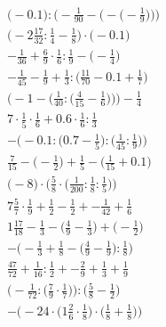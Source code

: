 \documentclass[8pt]{article}
\begin{document}
\begin{align}
\bigg(-0.1\bigg) : \bigg(-\frac{1}{90} - \Big(-\big(-\frac{1}{9}\big)\Big)\bigg) \\
\big(-2\frac{17}{32} : \frac{1}{4} - \frac{1}{8}\big) \cdot \big(-0.1\big) \\
-\frac{1}{36} + \frac{6}{9} \cdot \frac{1}{6} : \frac{1}{9} - \big(-\frac{1}{4}\big) \\
-\frac{1}{45} - \frac{1}{9} + \frac{1}{3} : \big(\frac{11}{70} - 0.1 + \frac{1}{7}\big) \\
\bigg(-1 - \Big(\frac{1}{40} : \big(\frac{4}{15} - \frac{1}{6}\big)\Big)\bigg) - \frac{1}{4} \\
7 \cdot \frac{1}{5} \cdot \frac{1}{6} + 0.6 \cdot \frac{1}{6} : \frac{1}{3} \\
-\Big(-0.1 : \big(0.7 - \frac{1}{5}\big) : \big(\frac{1}{45} : \frac{1}{9}\big)\Big) \\
\frac{7}{15} - \big(-\frac{1}{2}\big) + \frac{1}{5} - \big(\frac{1}{15} + 0.1\big) \\
\Big(-8\Big) \cdot \Big(\frac{5}{8} \cdot \big(\frac{1}{200} : \frac{1}{8} : \frac{1}{5}\big)\Big) \\
7\frac{5}{7} \cdot \frac{1}{9} + \frac{1}{2} - \frac{1}{2} + -\frac{1}{42} + \frac{1}{6} \\
1\frac{17}{18} - \frac{1}{3} - \big(\frac{4}{9} - \frac{1}{3}\big) + \big(-\frac{1}{2}\big) \\
-\Big(-\frac{1}{3} + \frac{1}{8} - \big(\frac{4}{9} - \frac{1}{9}\big) : \frac{1}{8}\Big) \\
\frac{47}{72} + \frac{1}{16} : \frac{1}{2} + -\frac{2}{9} + \frac{1}{3} + \frac{1}{9} \\
\Big(-\frac{1}{72} : \big(\frac{7}{9} \cdot \frac{1}{7}\big)\Big) : \Big(\frac{5}{8} - \frac{1}{2}\Big) \\
-\Big(-24 \cdot \big(1\frac{2}{6} \cdot \frac{1}{8}\big) \cdot \big(\frac{1}{8} + \frac{1}{8}\big)\Big)
\end{align}
\end{document}
